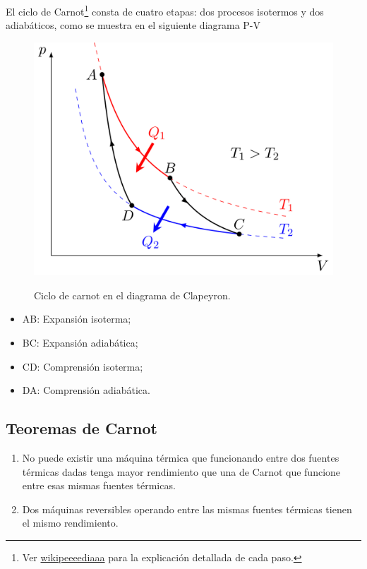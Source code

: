 El ciclo de Carnot\footnote{Ver \href{https://es.wikipedia.org/wiki/Ciclo_de_Carnot}{wikipeeeediaaa} para la explicación detallada de cada paso.} consta de cuatro etapas: dos procesos isotermos y dos adiabáticos, como se muestra en el siguiente diagrama P-V

	\begin{figure}[H]
		\centering
		\includegraphics[scale=0.15]{./img/PV_Ciclo_de_Carnot.png}
		\label{clapeyronCarnot}
		\caption{Ciclo de carnot en el diagrama de Clapeyron.}
	\end{figure}

\begin{itemize}
	\item AB: Expansión isoterma;
	\item BC: Expansión adiabática;
	\item CD: Comprensión isoterma;
	\item DA: Comprensión adiabática.
\end{itemize}

\subsection{Teoremas de Carnot}

\begin{enumerate}
	\item No puede existir una máquina térmica que funcionando entre dos fuentes térmicas dadas tenga mayor rendimiento que una de Carnot que funcione entre esas mismas fuentes térmicas.
	\item Dos máquinas reversibles operando entre las mismas fuentes térmicas tienen el mismo rendimiento.
\end{enumerate}



